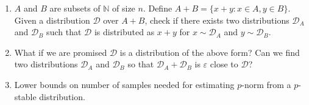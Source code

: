 \documentclass[oneside,11pt]{scrbook}
\theoremstyle{plain}
\theoremstyle{definition}
\theoremstyle{remark}
\newcommand{\eps}{\varepsilon}
\begin{document}
\begin{enumerate}

\item $A$ and $B$ are subsets of $\mathbb{N}$ of size $n$. Define
$A+B=\{x+y:x\in A, y\in B\}$. Given a distribution $\mathcal{D}$
over $A+B$, check if there exists two distributions $\mathcal{D}_A$
and $\mathcal{D}_B$ such that $\mathcal{D}$ is distributed as
$x+y$ for $x\sim\mathcal{D}_A$ and $y\sim\mathcal{D}_B$.

\item What if we are promised $\mathcal{D}$ is a distribution of
the above form? Can we find two distributions $\mathcal{D}_A$
and $\mathcal{D}_B$ so that $\mathcal{D}_A+\mathcal{D}_B$
is $\eps$ close to $\mathcal{D}$?

\item <fill in this question more clearly later> Lower bounds
on number of samples needed for estimating $p$-norm from
a $p$-stable distribution.

\end{enumerate}



\end{document}
